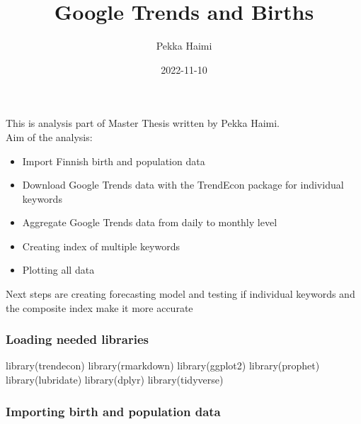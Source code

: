 \documentclass[
]{article}
\title{Google Trends and Births}
\author{Pekka Haimi}
\date{2022-11-10}
\newenvironment{Shaded}{\begin{snugshade}}{\end{snugshade}}
\newcommand{\FunctionTok}[1]{\textcolor[rgb]{0.00,0.00,0.00}{#1}}
\newcommand{\NormalTok}[1]{#1}
\begin{document}
\maketitle

This is analysis part of Master Thesis written by Pekka Haimi.\\
Aim of the analysis:

\begin{itemize}
\item
  Import Finnish birth and population data
\item
  Download Google Trends data with the TrendEcon package for individual
  keywords
\item
  Aggregate Google Trends data from daily to monthly level
\item
  Creating index of multiple keywords
\item
  Plotting all data
\end{itemize}

Next steps are creating forecasting model and testing if individual
keywords and the composite index make it more accurate

\hypertarget{loading-needed-libraries}{%
\subsubsection{Loading needed
libraries}\label{loading-needed-libraries}}

\begin{Shaded}
\begin{Highlighting}[]
\FunctionTok{library}\NormalTok{(trendecon)}
\FunctionTok{library}\NormalTok{(rmarkdown)}
\FunctionTok{library}\NormalTok{(ggplot2)}
\FunctionTok{library}\NormalTok{(prophet)}
\FunctionTok{library}\NormalTok{(lubridate)}
\FunctionTok{library}\NormalTok{(dplyr)}
\FunctionTok{library}\NormalTok{(tidyverse)}
\end{Highlighting}
\end{Shaded}

\hypertarget{importing-birth-and-population-data}{%
\subsubsection{Importing birth and population
data}\label{importing-birth-and-population-data}}
\end{document}

